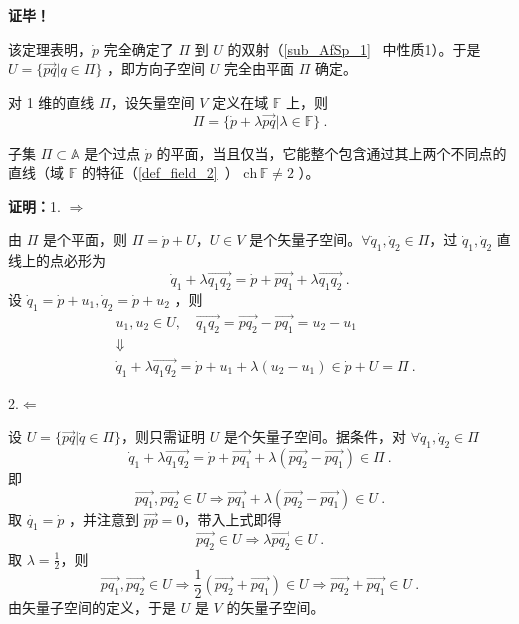 \textbf{证毕！}

该定理表明，$\dot p$ 完全确定了 $\Pi$ 到 $U$ 的双射（\autoref{sub_AfSp_1}~ 中性质1）。于是 $U=\{\overrightarrow{pq}|q\in \Pi\}$ ，即方向子空间 $U$ 完全由平面 $\Pi$ 确定。

对 1 维的直线 $\Pi$，设矢量空间 $V$ 定义在域 $\mathbb F$ 上，则
\begin{equation}\label{eq_SAfSp_4}
\Pi=\{\dot p+\lambda\overrightarrow{pq}|\lambda\in \mathbb F\}~.
\end{equation}
\begin{theorem}{}
子集 $\Pi \subset\mathbb A$ 是个过点 $\dot p$ 的平面，当且仅当，它能整个包含通过其上两个不同点的直线（域 $\mathbb F$ 的特征（\autoref{def_field_2}~） $\mathrm{ch}\,\mathbb F\neq 2$ ）。
\end{theorem}
\textbf{证明：}1.
$\Rightarrow$

由 $\Pi$ 是个平面，则 $\Pi=\dot p+U$，$U\in V$ 是个矢量子空间。$\forall\dot q_1,\dot q_2\in \Pi$，过 $\dot q_1,\dot q_2$ 直线上的点必形为
\begin{equation}
\dot q_1+\lambda\overrightarrow{q_1q_2}=\dot p+\overrightarrow{pq_1}+\lambda\overrightarrow{q_1q_2}~.
\end{equation}
设 $\dot q_1=\dot p+u_1,\dot q_2=\dot p+u_2$ ，则
\begin{equation}
\begin{aligned}
&u_1,u_2\in U,\quad \overrightarrow{q_1q_2}=\overrightarrow{pq_2}-\overrightarrow{pq_1}=u_2-u_1\\
&\Downarrow\\
&\dot q_1+\lambda\overrightarrow{q_1q_2}=\dot p+u_1+\lambda(u_2-u_1)\in\dot p+U=\Pi~.
\end{aligned}
\end{equation}

2.$\Leftarrow$

设 $U=\{\overrightarrow{pq}|\dot q\in \Pi\}$，则只需证明 $U$ 是个矢量子空间。据条件，对 $\forall \dot q_1,\dot q_2\in\Pi$
\begin{equation}
\dot q_1+\lambda\overrightarrow{q_1q_2}=\dot p+\overrightarrow{pq_1}+\lambda(\overrightarrow{pq_2}-\overrightarrow{pq_1})\in\Pi~.
\end{equation}
 即
 \begin{equation}
 \overrightarrow{pq_1},\overrightarrow{pq_2}\in U\Rightarrow \overrightarrow{pq_1}+\lambda(\overrightarrow{pq_2}-\overrightarrow{pq_1})\in U~.
 \end{equation}
 取 $\dot{q_1}=\dot{p}$ ，并注意到 $\overrightarrow{pp}=0$，带入上式即得 
 \begin{equation}\label{eq_SAfSp_2}
 \overrightarrow{pq_2}\in U\Rightarrow\lambda\overrightarrow{pq_2}\in U ~.
 \end{equation}
取 $\lambda=\frac{1}{2}$，则 
\begin{equation}
\overrightarrow{pq_1},\overrightarrow{pq_2}\in U\Rightarrow \frac{1}{2}(\overrightarrow{pq_2}+\overrightarrow{pq_1})\in U\Rightarrow \overrightarrow{pq_2}+\overrightarrow{pq_1}\in U~.
\end{equation}
由矢量子空间的定义，于是 $U$ 是 $V$ 的矢量子空间。

